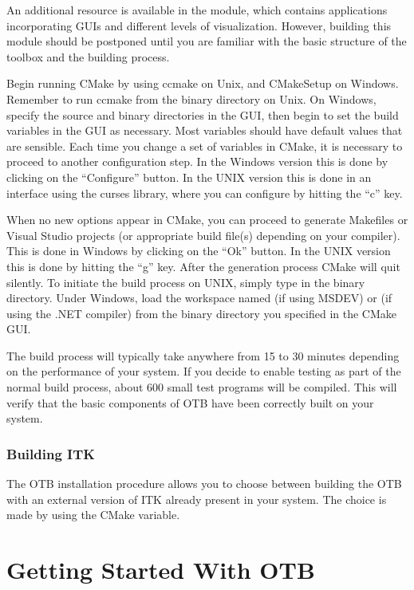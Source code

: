 An additional resource is available in the  module,
which contains applications incorporating GUIs and different levels
of visualization.  However, building this module
should be postponed until you are familiar with the basic structure of the
toolbox and the building process.

Begin running CMake by using
ccmake on Unix, and CMakeSetup on
Windows. Remember to run ccmake from the binary directory on Unix. On
Windows, specify the source and binary directories in the GUI, then begin to
set the build variables in the GUI as necessary.  Most variables should have
default values that are sensible. Each time you change a set of variables in
CMake, it is necessary to proceed to another configuration step. In the
Windows version this is done by clicking on the ``Configure'' button. In the
UNIX version this is done in an interface using the
curses library, where you can configure by hitting the ``c'' key.

When no new options appear in CMake, you can proceed to generate Makefiles or
Visual Studio projects (or appropriate build file(s) depending on your
compiler). This is done in Windows by clicking on the ``Ok'' button.  In the
UNIX version this is done by hitting the ``g'' key. After the generation
process CMake will quit silently. To initiate the build process on UNIX,
simply type  in the binary directory. Under Windows, load the
workspace named  (if using MSDEV) or  (if using
the .NET compiler) from the binary directory you specified in the CMake GUI.

The build process will typically take anywhere from 15 to 30 minutes depending
on the performance of your system. If you decide to enable testing as part of
the normal build process, about 600 small test programs will be compiled. This
will verify that the basic components of OTB have been correctly built on your
system.

\subsubsection{Building ITK}

The OTB installation procedure allows you to choose between building
the OTB with an external version of ITK already present in your
system. The choice is made by using the 
CMake variable.

\section{Getting Started With OTB }
\label{sec:GettingStartedWithOTB}

